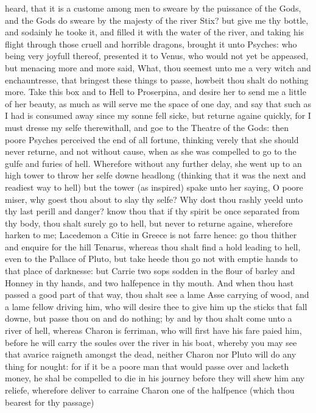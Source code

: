 heard, that it is a custome among men to sweare by the puissance of the Gods,
and the Gods do sweare by the majesty of the river Stix? but give me thy
bottle, and sodainly he tooke it, and filled it with the water of the river,
and taking his flight through those cruell and horrible dragons, brought it
unto Psyches: who being very joyfull thereof, presented it to Venus, who would
not yet be appeased, but menacing more and more said, What, thou seemest unto
me a very witch and enchauntresse, that bringest these things to passe, howbeit
thou shalt do nothing more. Take this box and to Hell to Proserpina, and desire
her to send me a little of her beauty, as much as will serve me the space of
one day, and say that such as I had is consumed away since my sonne fell sicke,
but returne againe quickly, for I must dresse my selfe therewithall, and goe to
the Theatre of the Gods: then poore Psyches perceived the end of all fortune,
thinking verely that she should never returne, and not without cause, when as
she was compelled to go to the gulfe and furies of hell. Wherefore without any
further delay, she went up to an high tower to throw her selfe downe headlong
(thinking that it was the next and readiest way to hell) but the tower (as
inspired) spake unto her saying, O poore miser, why goest thou about to slay
thy selfe? Why dost thou rashly yeeld unto thy last perill and danger? know
thou that if thy spirit be once separated from thy body, thou shalt surely go
to hell, but never to returne againe, wherefore harken to me; Lacedemon a Citie
in Greece is not farre hence: go thou thither and enquire for the hill Tenarus,
whereas thou shalt find a hold leading to hell, even to the Pallace of Pluto,
but take heede thou go not with emptie hands to that place of darknesse: but
Carrie two sops sodden in the flour of barley and Honney in thy hands, and two
halfepence in thy mouth. And when thou hast passed a good part of that way,
thou shalt see a lame Asse carrying of wood, and a lame fellow driving him, who
will desire thee to give him up the sticks that fall downe, but passe thou on
and do nothing; by and by thou shalt come unto a river of hell, whereas Charon
is ferriman, who will first have his fare paied him, before he will carry the
soules over the river in his boat, whereby you may see that avarice raigneth
amongst the dead, neither Charon nor Pluto will do any thing for nought: for if
it be a poore man that would passe over and lacketh money, he shal be compelled
to die in his journey before they will shew him any reliefe, wherefore deliver
to carraine Charon one of the halfpence (which thou bearest for thy passage)
